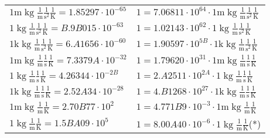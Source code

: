 \begin{center}
\begin{longtable}{l l}
{\color{gray}$1 \bm{\mathrm{ m}}\operatorname{kg}\frac1{\operatorname{m}}\frac1{\operatorname{s}^2}{}\frac1{\operatorname{K}} = 1.85297\cdot10^{-65} $}   & {\color{gray}$ 1 = 7.06811\cdot10^{64} \cdot 1 \bm{\mathrm{ m}}\operatorname{kg}\frac1{\operatorname{m}}\frac1{\operatorname{s}^2}{}\frac1{\operatorname{K}}$}  \\
{\color{black}$1 \bm{\mathrm{ }}\operatorname{kg}\frac1{\operatorname{m}}\frac1{\operatorname{s}^2}{}\frac1{\operatorname{K}} = B.9B015\cdot10^{-63} $}   & {\color{black}$ 1 = 1.02143\cdot10^{62} \cdot 1 \bm{\mathrm{ }}\operatorname{kg}\frac1{\operatorname{m}}\frac1{\operatorname{s}^2}{}\frac1{\operatorname{K}}$}  \\
{\color{gray}$1 \bm{\mathrm{ k}}\operatorname{kg}\frac1{\operatorname{m}}\frac1{\operatorname{s}^2}{}\frac1{\operatorname{K}} = 6.A1656\cdot10^{-60} $}   & {\color{gray}$ 1 = 1.90597\cdot10^{5B} \cdot 1 \bm{\mathrm{ k}}\operatorname{kg}\frac1{\operatorname{m}}\frac1{\operatorname{s}^2}{}\frac1{\operatorname{K}}$}  \\
{\color{gray}$1 \bm{\mathrm{ m}}\operatorname{kg}\frac1{\operatorname{m}}\frac1{\operatorname{s}}{}\frac1{\operatorname{K}} = 7.3379A\cdot10^{-32} $}   & {\color{gray}$ 1 = 1.79620\cdot10^{31} \cdot 1 \bm{\mathrm{ m}}\operatorname{kg}\frac1{\operatorname{m}}\frac1{\operatorname{s}}{}\frac1{\operatorname{K}}$}  \\
{\color{black}$1 \bm{\mathrm{ }}\operatorname{kg}\frac1{\operatorname{m}}\frac1{\operatorname{s}}{}\frac1{\operatorname{K}} = 4.26344\cdot10^{-2B} $}   & {\color{black}$ 1 = 2.A2511\cdot10^{2A} \cdot 1 \bm{\mathrm{ }}\operatorname{kg}\frac1{\operatorname{m}}\frac1{\operatorname{s}}{}\frac1{\operatorname{K}}$}  \\
{\color{gray}$1 \bm{\mathrm{ k}}\operatorname{kg}\frac1{\operatorname{m}}\frac1{\operatorname{s}}{}\frac1{\operatorname{K}} = 2.52A34\cdot10^{-28} $}   & {\color{gray}$ 1 = 4.B1268\cdot10^{27} \cdot 1 \bm{\mathrm{ k}}\operatorname{kg}\frac1{\operatorname{m}}\frac1{\operatorname{s}}{}\frac1{\operatorname{K}}$}  \\
{\color{gray}$1 \bm{\mathrm{ m}}\operatorname{kg}\frac1{\operatorname{m}}{}{}\frac1{\operatorname{K}} = 2.70B77\cdot10^{2} $}   & {\color{gray}$ 1 = 4.771B9\cdot10^{-3} \cdot 1 \bm{\mathrm{ m}}\operatorname{kg}\frac1{\operatorname{m}}{}{}\frac1{\operatorname{K}}$}  \\
{\color{black}$1 \bm{\mathrm{ }}\operatorname{kg}\frac1{\operatorname{m}}{}{}\frac1{\operatorname{K}} = 1.5BA09\cdot10^{5} $}   & {\color{black}$ 1 = 8.00A40\cdot10^{-6} \cdot 1 \bm{\mathrm{ }}\operatorname{kg}\frac1{\operatorname{m}}{}{}\frac1{\operatorname{K}}$}\quad(*)\\

\end{longtable}
\end{center}
